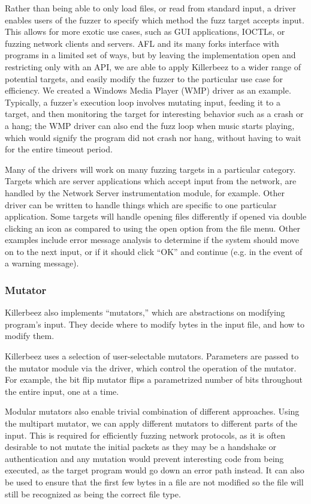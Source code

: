 \begin{multicols}{2}
Rather than being able to only load files, or read from standard input, a
driver enables users of the fuzzer to specify which method the fuzz target
accepts input. This allows for more exotic use cases, such as GUI applications,
IOCTLs, or fuzzing network clients and servers. AFL and its many forks
interface with programs in a limited set of ways, but by leaving the
implementation open and restricting only with an API, we are able to apply
Killerbeez to a wider range of potential targets, and easily modify the fuzzer
to the particular use case for efficiency. We created a Windows Media Player
(WMP) driver as an example.  Typically, a fuzzer's execution loop involves
mutating input, feeding it to a target, and then monitoring the target for
interesting behavior such as a crash or a hang; the WMP driver can also end the
fuzz loop when music starts playing, which would signify the program did not
crash nor hang, without having to wait for the entire timeout period.

Many of the drivers will work on many fuzzing targets in a particular category.
Targets which are server applications which accept input from the network, are
handled by the Network Server instrumentation module, for example. Other driver
can be written to handle things which are specific to one particular
application.  Some targets will handle opening files differently if opened via
double clicking an icon as compared to using the open option from the file
menu. Other examples include error message analysis to determine if the system
should move on to the next input, or if it should click ``OK'' and continue
(e.g. in the event of a warning message).

\subsubsection{Mutator} \label{Mutator Overview}
Killerbeez also implements ``mutators,'' which are abstractions on modifying
program's input. They decide where to modify bytes in the input file, and how
to modify them.

Killerbeez uses a selection of user-selectable mutators. Parameters are passed
to the mutator module via the driver, which control the operation of the
mutator. For example, the bit flip mutator flips a parametrized number of bits
throughout the entire input, one at a time.

Modular mutators also enable trivial combination of different approaches. Using
the multipart mutator, we can apply different mutators to different parts of
the input. This is required for efficiently fuzzing network protocols, as it is
often desirable to not mutate the initial packets as they may be a handshake or
authentication and any mutation would prevent interesting code from being
executed, as the target program would go down an error path instead. It can
also be used to ensure that the first few bytes in a file are not modified so
the file will still be recognized as being the correct file type.



\end{multicols}
